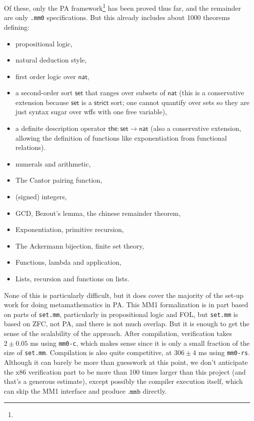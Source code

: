 \documentclass[runningheads]{llncs}
\begin{document}
Of these, only the PA framework\footnote{
} has been proved thus far, and the remainder are only \texttt{.mm0} specifications. But this already includes about 1000 theorems defining:
\begin{itemize}
  \item propositional logic,
  \item natural deduction style,
  \item first order logic over $\mathsf{nat}$,
  \item a second-order sort $\mathsf{set}$ that ranges over subsets of $\mathsf{nat}$ (this is a conservative extension because $\mathsf{set}$ is a $\mathsf{strict}$ sort; one cannot quantify over sets so they are just syntax sugar over wffs with one free variable),
  \item a definite description operator $\mathsf{the}:\mathsf{set}\to\mathsf{nat}$ (also a conservative extension, allowing the definition of functions like exponentiation from functional relations).
  \item numerals and arithmetic,
  \item The Cantor pairing function,
  \item (signed) integers,
  \item GCD, Bezout's lemma, the chinese remainder theorem,
  \item Exponentiation, primitive recursion,
  \item The Ackermann bijection, finite set theory,
  \item Functions, lambda and application,
  \item Lists, recursion and functions on lists.
\end{itemize}

None of this is particularly difficult, but it does cover the majority of the set-up work for doing metamathematics in PA. This \textsf{MM1} formalization is in part based on parts of \texttt{set.mm}, particularly in propositional logic and FOL, but \texttt{set.mm} is based on ZFC, not PA, and there is not much overlap. But it is enough to get the sense of the scalability of the approach. After compilation, verification takes $2\pm0.05$ ms using \texttt{mm0-c}, which makes sense since it is only a small fraction of the size of \texttt{set.mm}. Compilation is also quite competitive, at $306\pm 4$ ms using \texttt{mm0-rs}. Although it can barely be more than guesswork at this point, we don't anticipate the x86 verification part to be more than 100 times larger than this project (and that's a generous estimate), except possibly the compiler execution itself, which can skip the \textsf{MM1} interface and produce $\texttt{.mmb}$ directly.
\end{document}
